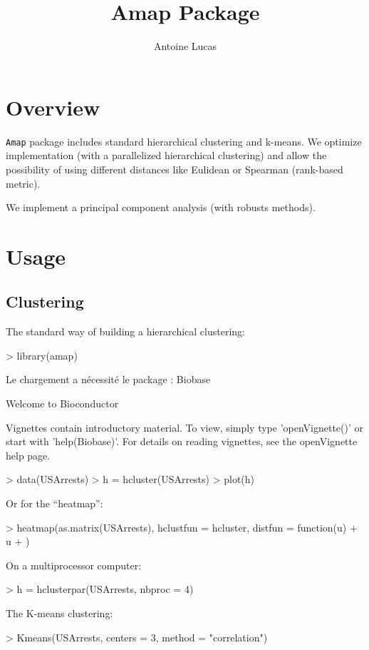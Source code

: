 \documentclass[a4paper]{article}
\title{Amap Package}
\author{Antoine Lucas}
\begin{document}
\maketitle

\tableofcontents

\section{Overview}

{\tt Amap} package includes standard hierarchical  
clustering and k-means. We optimize implementation 
(with a parallelized hierarchical clustering) and
allow the possibility of using different distances like
Eulidean or Spearman (rank-based metric).

We implement a principal component analysis (with robusts methods).

\section{Usage}

\subsection{Clustering}

The standard way of building  a hierarchical clustering:
\begin{Schunk}
\begin{Sinput}
> library(amap)
\end{Sinput}
\begin{Soutput}
Le chargement a nécessité le package : Biobase

Welcome to Bioconductor 

	Vignettes contain introductory material.
	To view, simply type 'openVignette()' or start with 'help(Biobase)'. 
	For details on reading vignettes, see the openVignette help page.
\end{Soutput}
\begin{Sinput}
> data(USArrests)
> h = hcluster(USArrests)
> plot(h)
\end{Sinput}
\end{Schunk}
 Or for the ``heatmap'':
\begin{Schunk}
\begin{Sinput}
> heatmap(as.matrix(USArrests), hclustfun = hcluster, distfun = function(u) {
+     u
+ })
\end{Sinput}
\end{Schunk}
On a multiprocessor computer:
\begin{Schunk}
\begin{Sinput}
> h = hclusterpar(USArrests, nbproc = 4)
\end{Sinput}
\end{Schunk}
The K-means clustering:
\begin{Schunk}
\begin{Sinput}
> Kmeans(USArrests, centers = 3, method = "correlation")
\end{Sinput}
\end{Schunk}
\end{document}
